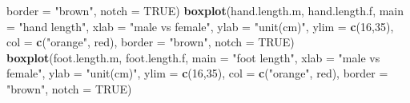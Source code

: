\documentclass[]{article}
\newenvironment{Shaded}{\begin{snugshade}}{\end{snugshade}}
\newcommand{\DataTypeTok}[1]{\textcolor[rgb]{0.13,0.29,0.53}{#1}}
\newcommand{\DecValTok}[1]{\textcolor[rgb]{0.00,0.00,0.81}{#1}}
\newcommand{\KeywordTok}[1]{\textcolor[rgb]{0.13,0.29,0.53}{\textbf{#1}}}
\newcommand{\NormalTok}[1]{#1}
\newcommand{\OtherTok}[1]{\textcolor[rgb]{0.56,0.35,0.01}{#1}}
\newcommand{\StringTok}[1]{\textcolor[rgb]{0.31,0.60,0.02}{#1}}
\begin{document}
\begin{Shaded}
\begin{Highlighting}[]
        \DataTypeTok{border =} \StringTok{"brown"}\NormalTok{,}
        \DataTypeTok{notch =} \OtherTok{TRUE}\NormalTok{)}
\KeywordTok{boxplot}\NormalTok{(hand.length.m, hand.length.f,}
        \DataTypeTok{main =} \StringTok{"hand length"}\NormalTok{,}
        \DataTypeTok{xlab =} \StringTok{"male vs female"}\NormalTok{,}
        \DataTypeTok{ylab =} \StringTok{"unit(cm)"}\NormalTok{,}
        \DataTypeTok{ylim =} \KeywordTok{c}\NormalTok{(}\DecValTok{16}\NormalTok{,}\DecValTok{35}\NormalTok{),}
        \DataTypeTok{col =} \KeywordTok{c}\NormalTok{(}\StringTok{"orange"}\NormalTok{, }\StringTok{\textquotesingle{}red\textquotesingle{}}\NormalTok{),}
        \DataTypeTok{border =} \StringTok{"brown"}\NormalTok{,}
        \DataTypeTok{notch =} \OtherTok{TRUE}\NormalTok{)}
\KeywordTok{boxplot}\NormalTok{(foot.length.m, foot.length.f,}
        \DataTypeTok{main =} \StringTok{"foot length"}\NormalTok{,}
        \DataTypeTok{xlab =} \StringTok{"male vs female"}\NormalTok{,}
        \DataTypeTok{ylab =} \StringTok{"unit(cm)"}\NormalTok{,}
        \DataTypeTok{ylim =} \KeywordTok{c}\NormalTok{(}\DecValTok{16}\NormalTok{,}\DecValTok{35}\NormalTok{),}
        \DataTypeTok{col =} \KeywordTok{c}\NormalTok{(}\StringTok{"orange"}\NormalTok{, }\StringTok{\textquotesingle{}red\textquotesingle{}}\NormalTok{),}
        \DataTypeTok{border =} \StringTok{"brown"}\NormalTok{,}
        \DataTypeTok{notch =} \OtherTok{TRUE}\NormalTok{)}
\end{Highlighting}
\end{Shaded}
\end{document}
